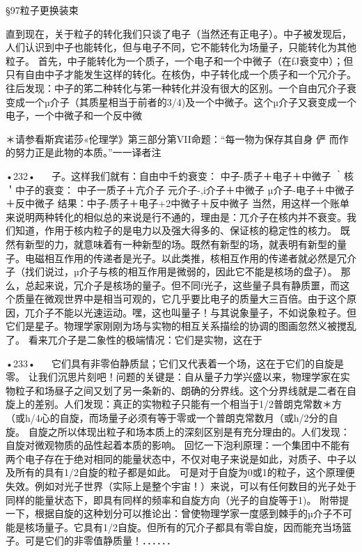 §97粒子更换装束

直到现在，关于粒子的转化我们只谈了电子（当然还有正电子）。中子被发现后，人们认识到中子也能转化，但与电子不同，它不能转化为场量子，只能转化为其他粒子。
首先，中子能转化为一个质子，一个电子和一个中微子（在fJ衰变中）；但只有自由中子才能发生这样的转化。在核伪，中子转化成一个质子和一个冗介子。往后发现：中子的笫二种转化与笫一种转化并没有很大的区别。一个自由冗介子衰变成一个µ介子（其质星相当于前者的3/4)及一个中微子。这个µ介子又衰变成一个电子，一个中微子和一个反中微

＊请参看斯宾诺莎«伦理学》第三部分第VII命题：“每一物为保存其自身
	俨	而作的努力正是此物的本质。”一一译者注

•232•
  
子。这样我们就有：自由中千虳衰变：
中子-质子＋电子＋中微子
｀核＇中子的衰变：
中子一质子＋亢介子
元介子-,i介子＋中微子
µ介子-电子＋中微子＋反中微子
结果：中子-质子＋电子+2中微子＋反中微子
当然，用这样一个账单来说明两种转化的相似总的来说是行不通的，理由是：兀介子在核内并不衰变。我们知道，作用于核内粒子的是电力以及强大得多的、保证核的稳定性的核力。
既然有新型的力，就意味着有一种新型的场。既然有新型的场，就表明有新型的量子。电磁相互作用的传递者是光子。以此类推，核相互作用的传递者就必然是冗介子（找们说过，µ介子与核的相互作用是微弱的，因此它不能是核场的盘子）。
那么，总起来说，冗介子是核场的量子。但不同f光子，这些量子具有静质噩，而这个质量在微观世界中是相当可观的，它几乎要比电子的质量大三百倍。由于这个原因，兀介子不能以光速运动。嘿，这也叫量子！与其说象量子，不如说象粒子。但它们是星子。物理学家刚刚为场与实物的相互关系描绘的协调的图画忽然义被搅乱了。
看来兀介子是二象性的极端情况：它们是实物，这在于

•233•
  
它们具有非零伯静质鼠；它们又代表着一个场，这在于它们的自旋是零。
让我们沉思片刻吧！问题的关键是：自从量子力学兴盛以来，物理学家在实物粒子和场昼子之间又划了另一条新的、朗确的分界线。这个分界线就是二者在自旋上的差别。人们发现：真正的实物粒子只能有一个相当于1/2普朗克常数＊方（或h/4心的自旋，而场量子必须有等于零或一个普朗克常数月（或h/2分的自旋。
自旋之所以体现出粒子和场本质上的深刻区别是有充分理由的。人们发现：自旋对微观物质的品性起着本质的影响。
回忆一下泡利原理：一个集团中不能有两个电子存在于绝对相同的能量状态中，不仅对电子来说是如此，对质子、中子以及所有的具有1/2自旋的粒子都是如此。
可是对于自旋为0或1的粒子，这个原理便失效。例如对光子世界（实际上是整个宇宙！）来说，可以有任何数目的光子处于同样的能量状态下，即具有同样的频率和自旋方向（光子的自旋等于1)。
附带提一下，根据自旋的这种划分可以推论出：曾使物理学家一度感到棘手的µ介子不可能是核场量子。它具有1/2自旋。但所有的冗介子都具有零自旋，因而能充当场篮子。可是它们的非零值静质量！．．．．．．

